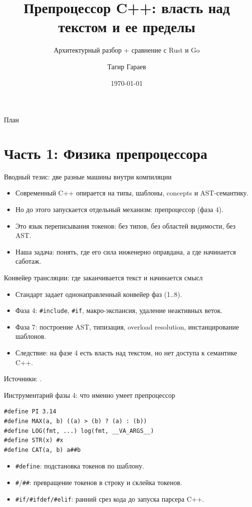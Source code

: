 \documentclass{beamer}
\author{Тагир Гараев}
\title{Препроцессор C++: власть над текстом и ее пределы}
\subtitle{Архитектурный разбор + сравнение с Rust и Go}
\institute{C++ Семинар}
\date{\today}
\begin{document}
\begin{frame}
    \titlepage
\end{frame}

\begin{frame}{План}
    \tableofcontents
\end{frame}

\section{Часть 1: Физика препроцессора}

\begin{frame}{Вводный тезис: две разные машины внутри компиляции}
    \begin{itemize}
        \item Современный C++ опирается на типы, шаблоны, concepts и AST-семантику.
        \item Но до этого запускается отдельный механизм: препроцессор (фаза 4).
        \item Это язык переписывания токенов: без типов, без областей видимости, без AST.
        \item Наша задача: понять, где его сила инженерно оправдана, а где начинается саботаж.
    \end{itemize}
\end{frame}

\begin{frame}{Конвейер трансляции: где заканчивается текст и начинается смысл}
    \begin{itemize}
        \item Стандарт задает однонаправленный конвейер фаз (1..8).
        \item Фаза 4: \texttt{\#include}, \texttt{\#if}, макро-экспансия, удаление неактивных веток.
        \item Фаза 7: построение AST, типизация, overload resolution, инстанцирование шаблонов.
        \item Следствие: на фазе 4 есть власть над текстом, но нет доступа к семантике C++.
    \end{itemize}
    \vspace{0.4em}
    Источники: \cite{cpp_draft_lex_phases,cpp_draft_cpp_pre}.
\end{frame}

\begin{frame}[fragile]{Инструментарий фазы 4: что именно умеет препроцессор}
\begin{lstlisting}
#define PI 3.14
#define MAX(a, b) ((a) > (b) ? (a) : (b))
#define LOG(fmt, ...) log(fmt, __VA_ARGS__)
#define STR(x) #x
#define CAT(a, b) a##b
\end{lstlisting}
    \begin{itemize}
        \item \texttt{\#define}: подстановка токенов по шаблону.
        \item \texttt{\#}/\texttt{\#\#}: превращение токенов в строку и склейка токенов.
        \item \texttt{\#if/\#ifdef/\#elif}: ранний срез кода до запуска парсера C++.
    \end{itemize}
\end{frame}
\end{document}
